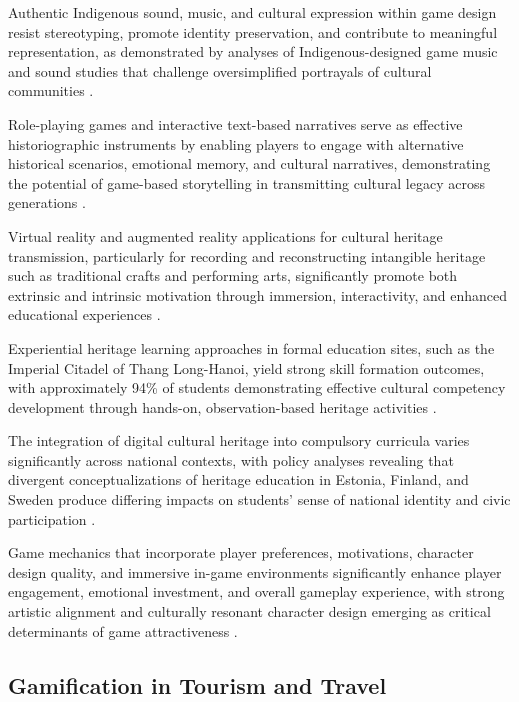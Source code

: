 \documentclass{research}
\begin{document}
Authentic Indigenous sound, music, and cultural expression within game design resist
stereotyping, promote identity preservation, and contribute to meaningful representation,
as demonstrated by analyses of Indigenous-designed game music and sound studies that
challenge oversimplified portrayals of cultural communities
\citep{galloway2024,xu2023,wu2023}.

Role-playing games and interactive text-based narratives serve as effective
historiographic instruments by enabling players to engage with alternative historical
scenarios, emotional memory, and cultural narratives, demonstrating the potential of
game-based storytelling in transmitting cultural legacy across generations
\citep{santos2015,belov2022,cassone2021}.

Virtual reality and augmented reality applications for cultural heritage transmission,
particularly for recording and reconstructing intangible heritage such as traditional
crafts and performing arts, significantly promote both extrinsic and intrinsic motivation
through immersion, interactivity, and enhanced educational experiences
\citep{tian2025,stylianidis2025,lai2025}.

Experiential heritage learning approaches in formal education sites, such as the
Imperial Citadel of Thang Long-Hanoi, yield strong skill formation outcomes, with
approximately 94\% of students demonstrating effective cultural competency development
through hands-on, observation-based heritage activities
\citep{tran2024,gonzalezsanz2022,gomezhurtado2021}.

The integration of digital cultural heritage into compulsory curricula varies
significantly across national contexts, with policy analyses revealing that divergent
conceptualizations of heritage education in Estonia, Finland, and Sweden produce
differing impacts on students' sense of national identity and civic participation
\citep{lofstrom2024,jagielska2021,santos2024}.

Game mechanics that incorporate player preferences, motivations, character design
quality, and immersive in-game environments significantly enhance player engagement,
emotional investment, and overall gameplay experience, with strong artistic alignment
and culturally resonant character design emerging as critical determinants of game
attractiveness \citep{li2023,dzjanakhmetov2024,kou2023,vries2023}.

\subsection{Gamification in Tourism and Travel}
\end{document}
